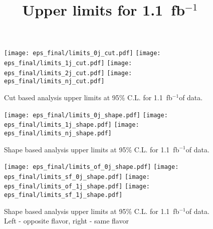 \documentclass{cmspaper}
\newcommand{\usedLumi}{1.1~fb$^{-1}$}
\begin{document}
\title{Upper limits for \usedLumi}

\begin{figure}[!htbp]
\begin{center}
   \texttt{[image: eps\_final/limits\_0j\_cut.pdf]}
   \texttt{[image: eps\_final/limits\_1j\_cut.pdf]}
   \texttt{[image: eps\_final/limits\_2j\_cut.pdf]}
   \texttt{[image: eps\_final/limits\_nj\_cut.pdf]}
   \caption{Cut based analysis upper limits at 95\% C.L. for \usedLumi of data.}
\end{center}
\end{figure}

\begin{figure}[!htbp]
\begin{center}
   \texttt{[image: eps\_final/limits\_0j\_shape.pdf]}
   \texttt{[image: eps\_final/limits\_1j\_shape.pdf]}
   \texttt{[image: eps\_final/limits\_nj\_shape.pdf]}
   \caption{Shape based analysis upper limits at 95\% C.L. for \usedLumi of data.}
\end{center}
\end{figure}


\begin{figure}[!htbp]
\begin{center}
   \texttt{[image: eps\_final/limits\_of\_0j\_shape.pdf]}
   \texttt{[image: eps\_final/limits\_sf\_0j\_shape.pdf]}
   \texttt{[image: eps\_final/limits\_of\_1j\_shape.pdf]}
   \texttt{[image: eps\_final/limits\_sf\_1j\_shape.pdf]}
   \caption{Shape based analysis upper limits at 95\% C.L. for \usedLumi of data. 
     Left - opposite flavor, right - same flavor }
\end{center}
\end{figure}
\end{document}
